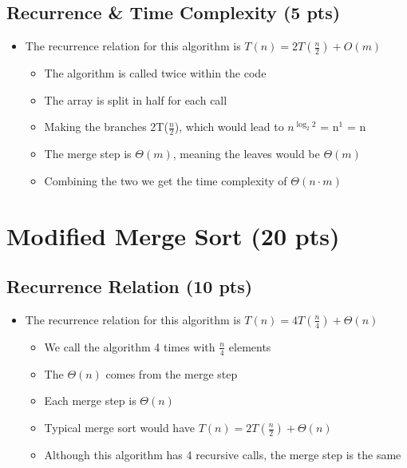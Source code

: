 \documentclass{article}[12pt]
\begin{document}
\subsection{Recurrence \& Time Complexity (5 pts)}
\begin{itemize}
  \item The recurrence relation for this 
    algorithm is $T(n) = 2T(\frac{n}{2}) + O(m)$
    \begin{itemize}
      \item The algorithm is called twice within the code
      \item The array is split in half for each call
      \item Making the branches 2T($\frac{n}{2}$), which would lead
        to $n^{\log_{2} 2}$ = n$^{1}$ = n
      \item The merge step is $\Theta(m)$, meaning the leaves would be $\Theta(m)$
      \item Combining the two we get the time complexity of $\Theta(n \cdot m)$
    \end{itemize}
\end{itemize}

\newpage
\section{Modified Merge Sort (20 pts)}

\vspace*{10px}
\subsection{Recurrence Relation (10 pts)}
\begin{itemize}
  \item The recurrence relation for 
    this algorithm is $T(n) = 4T(\frac{n}{4}) + \Theta(n)$
    \begin{itemize}
      \item We call the algorithm 4 times with $\frac{n}{4}$ elements
      \item The $\Theta(n)$ comes from the merge step
      \item Each merge step is $\Theta(n)$
      \item Typical merge sort would have $T(n) = 2T(\frac{n}{2}) + \Theta(n)$
      \item Although this algorithm has 4 recursive calls,
        the merge step is the same
    \end{itemize}
\end{itemize}
\end{document}
